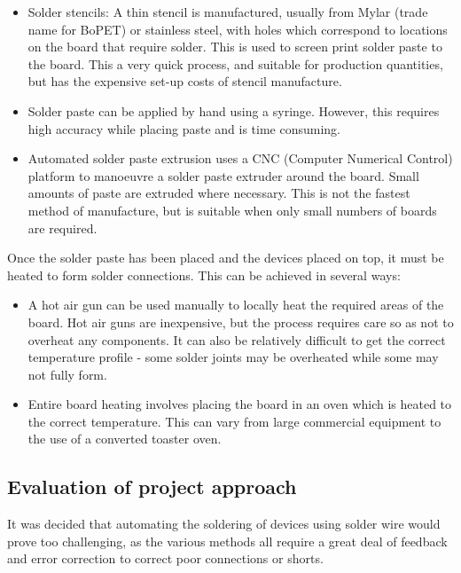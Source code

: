 \begin{itemize}
			\item	Solder stencils: A thin stencil is manufactured, usually from Mylar (trade name for BoPET) or stainless steel, with holes which correspond to locations on the board that require solder.
					This is used to screen print solder paste to the board.
					This a very quick process, and suitable for production quantities, but has the expensive set-up costs of stencil manufacture.
			\item	Solder paste can be applied by hand using a syringe. However, this requires high accuracy while placing paste and is time consuming.
			\item	Automated solder paste extrusion uses a CNC (Computer Numerical Control) platform to manoeuvre a solder paste extruder around the board. Small amounts of paste
					are extruded where necessary. This is not the fastest method of manufacture, but is suitable when only small numbers of boards are required.
\end{itemize}

Once the solder paste has been placed and the devices placed on top, it must be heated to form solder connections. This can be achieved in several ways:

\begin{itemize}
			\item	A hot air gun can be used manually to locally heat the required areas of the board. Hot air guns are inexpensive, but the process requires care so as not to overheat any
					components. It can also be relatively difficult to get the correct temperature profile - some solder joints may be overheated while some may not fully form.
			\item	Entire board heating involves placing the board in an oven which is heated to the correct temperature. This can vary from large commercial equipment to the use of a
					converted toaster oven.
\end{itemize}
			
\subsection{Evaluation of project approach}
It was decided that automating the soldering of devices using solder wire
would prove too challenging, as the various methods all require a great
deal of feedback and error correction to correct poor connections or shorts.


